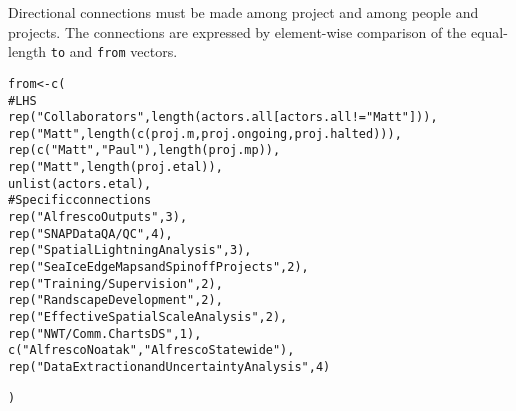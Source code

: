 \documentclass{article}\usepackage[]{graphicx}\usepackage[]{color}
\makeatletter
\newcommand{\hlnum}[1]{\textcolor[rgb]{0.863,0.196,0.184}{#1}}%
\newcommand{\hlstr}[1]{\textcolor[rgb]{0.863,0.196,0.184}{#1}}%
\newcommand{\hlcom}[1]{\textcolor[rgb]{0.345,0.431,0.459}{#1}}%
\newcommand{\hlopt}[1]{\textcolor[rgb]{0.576,0.631,0.631}{#1}}%
\newcommand{\hlstd}[1]{\textcolor[rgb]{0.514,0.58,0.588}{#1}}%
\newcommand{\hlkwb}[1]{\textcolor[rgb]{0.522,0.6,0}{#1}}%
\newcommand{\hlkwd}[1]{\textcolor[rgb]{0.576,0.631,0.631}{#1}}%
\newenvironment{kframe}{%
 \def\at@end@of@kframe{}%
 \ifinner\ifhmode%
  \def\at@end@of@kframe{\end{minipage}}%
  \begin{minipage}{\columnwidth}%
 \fi\fi%
 \def\FrameCommand##1{\hskip\@totalleftmargin \hskip-\fboxsep
 \colorbox{shadecolor}{##1}\hskip-\fboxsep
     \hskip-\linewidth \hskip-\@totalleftmargin \hskip\columnwidth}%
 \MakeFramed {\advance\hsize-\width
   \@totalleftmargin\z@ \linewidth\hsize
   \@setminipage}}%
 {\par\unskip\endMakeFramed%
 \at@end@of@kframe}
\newenvironment{knitrout}{}{} %
\makeatother
\begin{document}
Directional connections must be made among project and among people and projects.
The connections are expressed by element-wise comparison of the equal-length \texttt{to} and \texttt{from} vectors.

\begin{knitrout}
\color{fgcolor}\begin{kframe}
\begin{alltt}
\hlstd{from} \hlkwb{<-} \hlkwd{c}\hlstd{(}
        \hlcom{# LHS}
        \hlkwd{rep}\hlstd{(}\hlstr{"Collaborators"}\hlstd{,} \hlkwd{length}\hlstd{(actors.all[actors.all}\hlopt{!=}\hlstr{"Matt"}\hlstd{])),}
        \hlkwd{rep}\hlstd{(}\hlstr{"Matt"}\hlstd{,} \hlkwd{length}\hlstd{(}\hlkwd{c}\hlstd{(proj.m, proj.ongoing, proj.halted))),}
        \hlkwd{rep}\hlstd{(}\hlkwd{c}\hlstd{(}\hlstr{"Matt"}\hlstd{,} \hlstr{"Paul"}\hlstd{),} \hlkwd{length}\hlstd{(proj.mp)),}
        \hlkwd{rep}\hlstd{(}\hlstr{"Matt"}\hlstd{,} \hlkwd{length}\hlstd{(proj.etal)),}
        \hlkwd{unlist}\hlstd{(actors.etal),}
        \hlcom{# Specific connections}
        \hlkwd{rep}\hlstd{(}\hlstr{"Alfresco Outputs"}\hlstd{,} \hlnum{3}\hlstd{),}
        \hlkwd{rep}\hlstd{(}\hlstr{"SNAP Data QA/QC"}\hlstd{,} \hlnum{4}\hlstd{),}
        \hlkwd{rep}\hlstd{(}\hlstr{"Spatial Lightning Analysis"}\hlstd{,} \hlnum{3}\hlstd{),}
        \hlkwd{rep}\hlstd{(}\hlstr{"Sea Ice Edge Maps and Spinoff Projects"}\hlstd{,} \hlnum{2}\hlstd{),}
        \hlkwd{rep}\hlstd{(}\hlstr{"Training/Supervision"}\hlstd{,} \hlnum{2}\hlstd{),}
        \hlkwd{rep}\hlstd{(}\hlstr{"Randscape Development"}\hlstd{,} \hlnum{2}\hlstd{),}
        \hlkwd{rep}\hlstd{(}\hlstr{"Effective Spatial Scale Analysis"}\hlstd{,} \hlnum{2}\hlstd{),}
        \hlkwd{rep}\hlstd{(}\hlstr{"NWT/Comm. Charts DS"}\hlstd{,} \hlnum{1}\hlstd{),}
        \hlkwd{c}\hlstd{(}\hlstr{"Alfresco Noatak"}\hlstd{,} \hlstr{"Alfresco Statewide"}\hlstd{),}
        \hlkwd{rep}\hlstd{(}\hlstr{"Data Extraction and Uncertainty Analysis"}\hlstd{,} \hlnum{4}\hlstd{)}

\hlstd{)}


\end{alltt}
\end{kframe}
\end{knitrout}
\end{document}
